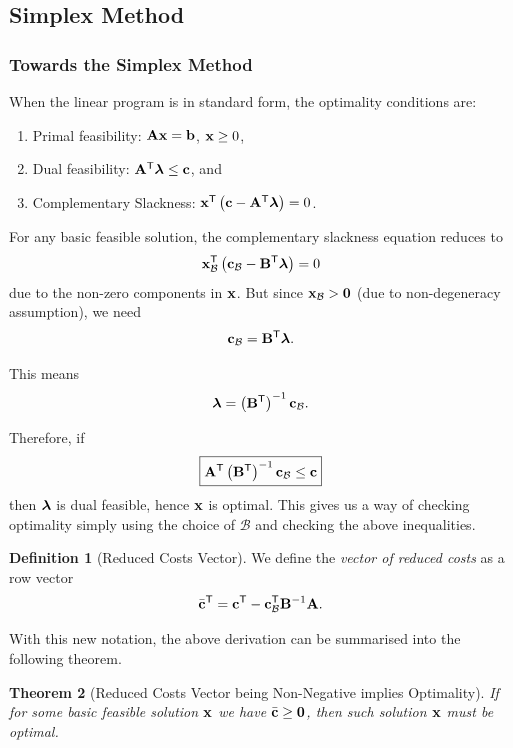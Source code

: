 \documentclass[11pt]{article}
\newtheorem{theorem}{Theorem}[section]
\theoremstyle{definition}
\newtheorem{definition}[theorem]{Definition}
\theoremstyle{remark}
\newcommand{\pqty}[1]{\left(#1\right)}
\newcommand{\transpose}{^{\mathsf{T}}}
\newcommand{\inverse}{^{-1}}
\begin{document}
\subsection{Simplex Method}
\subsubsection{Towards the Simplex Method}

When the linear program is in standard form, the optimality conditions are:
\begin{enumerate}
    \item Primal feasibility: \(\vb{Ax} = \vb{b}\), \(\vb{x} \geq 0\),
    \item Dual feasibility: \(\vb{A}\transpose \vb*{\lambda} \leq \vb{c}\), and
    \item Complementary Slackness: \(\vb{x}\transpose \pqty{\vb{c} - \vb{A}\transpose \vb*{\lambda}} = 0\).
\end{enumerate}

For any basic feasible solution, the complementary slackness equation reduces to
\[
    \vb{x}_{\mathcal{B}}\transpose \pqty{\vb{c}_{\mathcal{B}} - \vb{B}\transpose \vb*{\lambda}} = 0
\]
due to the non-zero components in \(\vb{x}\). But since \(\vb{x}_{\mathcal{B}} > \vb{0}\) (due to non-degeneracy assumption), we need
\[
    \vb{c}_{\mathcal{B}} = \vb{B}\transpose \vb*{\lambda}.
\]  

This means
\[
    \vb*{\lambda} = \pqty{\vb{B}\transpose}\inverse \vb{c}_{\mathcal{B}}.
\]

Therefore, if
\[
    \boxed{\vb{A}\transpose \pqty{\vb{B}\transpose}\inverse \vb{c}_{\mathcal{B}} \leq \vb{c}}
\]
then \(\vb*{\lambda}\) is dual feasible, hence \(\vb{x}\) is optimal. This gives us a way of checking optimality simply using the choice of \(\mathcal{B}\) and checking the above inequalities.

\begin{definition}[Reduced Costs Vector]\label{optim-unit-0052}
    We define the \emph{vector of reduced costs} as a row vector
    \[
        \bar{\vb{c}}\transpose = \vb{c}\transpose - \vb{c}_{\mathcal{B}}
        \transpose \vb{B}\inverse \vb{A}.
    \]
\end{definition}

With this new notation, the above derivation can be summarised into the following theorem.

\begin{theorem}[Reduced Costs Vector being Non-Negative implies Optimality]\label{optim-unit-0053}
    If for some basic feasible solution \(\vb{x}\) we have \(\bar{\vb{c}} \geq \vb{0}\), then such solution \(\vb{x}\) must be optimal.
\end{theorem}
\end{document}
